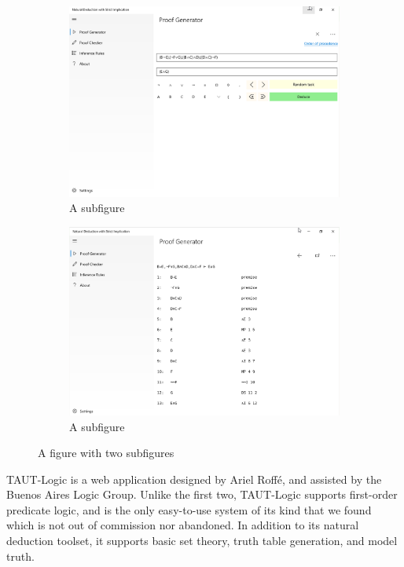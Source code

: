 \documentclass[ms]{uncgdissertationexp2}
\theoremstyle{plain}
\theoremstyle{definition}
\theoremstyle{remark}
\begin{document}
\begin{figure}[!ht]
	\centering
	\begin{subfigure}{.5\textwidth}
		\centering
		\includegraphics[width=0.9\linewidth]{w10app-1.png}
		\caption{A subfigure}
		\label{fig:sub1}
	\end{subfigure}%
	\begin{subfigure}{.5\textwidth}
		\centering
		\includegraphics[width=0.9\linewidth]{w10app-2.png}
		\caption{A subfigure}
		\label{fig:sub2}
	\end{subfigure}
	\caption{A figure with two subfigures}
	\label{fig:test}
\end{figure}

TAUT-Logic is a web application designed by Ariel Roff\'e, and assisted by the Buenos Aires Logic Group. Unlike the first two, TAUT-Logic supports first-order predicate logic, and is the only easy-to-use system of its kind that we found which is not out of commission nor abandoned. In addition to its natural deduction toolset, it supports basic set theory,  truth table generation, and model truth. 
\end{document}
